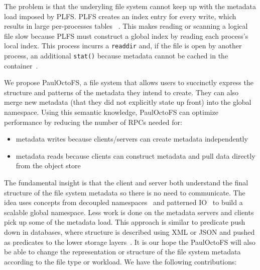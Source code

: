  
The problem is that the underyling file system cannot keep up with the metadata
load imposed by PLFS. PLFS creates an index entry for every write, which
results in large per-processes tables ~\cite{grider:pc17-diddlings}. This makes
reading or scanning a logical file slow because PLFS must construct a global
index by reading each process's local index. This process incurrs a
\texttt{readdir} and, if the file is open by another process, an additional
\texttt{stat()} because metadata cannot be cached in the
container~\cite{bent_plfs_2009}.

We propose PaulOctoFS, a file system that allows users to succinctly express
the structure and patterns of the metadata they intend to create.  They can
also merge new metadata (that they did not explicitly state up front) into the
global namespace.  Using this semantic knowledge, PaulOctoFS can optimize
performance by reducing the number of RPCs needed for:

\begin{itemize}

  \item metadata writes because clients/servers can create metadata
  independently

  \item metadata reads because clients can construct metadata and pull data
  directly from the object store

\end{itemize}

The fundamental insight is that the client and server both understand the final
structure of the file system metadata so there is no need to communicate.  The
idea uses concepts from decoupled namespaces~\cite{zheng:pdsw2014-batchfs,
zheng:pdsw2015-deltafs} and patterned IO~\cite{he:hpdc13-plfs-patterns} to
build a scalable global namespace. Less work is done on the metadata servers
and clients pick up some of the metadata load.  This approach is similar to
predicate push down in databases, where structure is described using XML or
JSON and pushed as predicates to the lower storage
layers~\cite{shel:pc17-pushdown}. It is our hope the PaulOctoFS will also be
able to change the representation or structure of the file system metadata
according to the file type or workload.  We have the following contributions:

